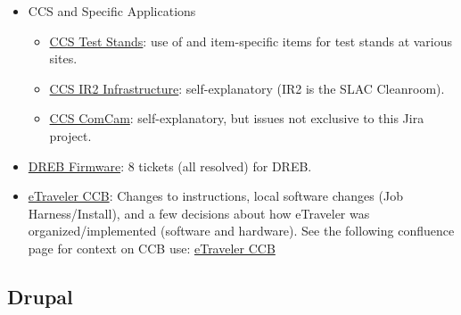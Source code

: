 \begin{itemize}
\begin{itemize}
		\item \href{https://jira.slac.stanford.edu/browse/LSSTCCSSHUTTER}{CCS Shutter}:  self-explanatory.
		\item \href{https://jira.slac.stanford.edu/browse/LSSTCCSUT}{CCS Utility Trunk}:  self-explanatory.
		\item \href{https://jira.slac.stanford.edu/browse/LCOBM}{CCS OCS Bridge and MCM}:  self-explanatory.
		\item \href{https://jira.slac.stanford.edu/browse/LSSTCCSDAQ}{CCS DAQ}:  self-explanatory.
		\item \href{https://jira.slac.stanford.edu/browse/LSSTCCSFCS}{CCS FCS}:  self-explanatory (FCS - filter change system?).
	\end{itemize}
	\item CCS and Specific Applications
	\begin{itemize}
		\item \href{https://jira.slac.stanford.edu/browse/LSSTCCSTS}{CCS Test Stands}:  use of and item-specific items for test stands at various sites.
		\item \href{https://jira.slac.stanford.edu/browse/LSSTIR}{CCS IR2 Infrastructure}:  self-explanatory (IR2 is the SLAC Cleanroom).
		\item \href{https://jira.slac.stanford.edu/browse/LSSTCCSCOM}{CCS ComCam}:  self-explanatory, but issues not exclusive to this Jira project.
	\end{itemize}
	\item \href{https://jira.slac.stanford.edu/browse/LSSTDREB}{DREB Firmware}:  8 tickets (all resolved) for DREB.
	\item \href{https://jira.slac.stanford.edu/browse/ETCCB}{eTraveler CCB}:  Changes to instructions, local software changes (Job Harness/Install), and a few decisions about how eTraveler was organized/implemented (software and hardware). See the following confluence page for context on CCB use: \href{https://confluence.slac.stanford.edu/display/LSSTCAM/eTraveler+CCB}{eTraveler CCB}
\end{itemize}

\subsection{Drupal}

